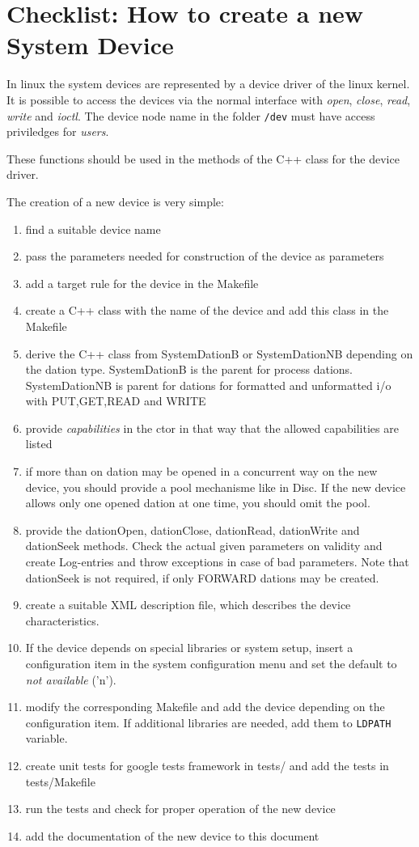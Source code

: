 \section{Checklist: How to create a new System Device}
In linux the system devices are represented by a device driver of
the linux kernel.
It is possible to access the devices via the normal interface
with {\em open}, {\em close}, {\em read}, {\em write} and {\em ioctl}.
The device node name in the folder \verb|/dev| must have access
priviledges for {\em users}.

These functions should be used in the methods of the C++ class 
for the device driver.


The creation of a new device is very simple:
\begin{enumerate}
\item find a suitable device name
\item pass the parameters needed for construction of the device as
      parameters
\item add a target rule for the device in the Makefile
\item create a C++ class with the name of the device and add this class
      in the Makefile
\item derive the C++ class from SystemDationB or SystemDationNB depending
      on the dation type. SystemDationB is the parent for process dations.
      SystemDationNB is parent for dations for formatted and unformatted
      i/o with PUT,GET,READ and WRITE
\item provide {\em capabilities} in the ctor in that way that the allowed
      capabilities are listed
\item if more than on dation may be opened in a concurrent way on the new
      device, you should provide a pool mechanisme like in Disc.
      If the new device allows only one opened dation at one time, you 
      should omit the pool.
\item provide the dationOpen, dationClose, dationRead, dationWrite 
      and dationSeek methods. Check the actual given parameters on
      validity and create Log-entries and throw exceptions in case
      of bad parameters.
      Note that dationSeek is not required, if only FORWARD dations
      may be created.
\item create a suitable XML description file, which describes the
      device characteristics.
\item If the device depends on special libraries or 
      system setup, insert a configuration item  
      in the system configuration menu
      and set the default to {\em not available} ('n').
\item modify the corresponding Makefile and add the device depending on
      the configuration item. If additional libraries are needed,
      add them to \texttt{LDPATH} variable. 
\item create unit tests for google tests framework in tests/ and add the
      tests in tests/Makefile
\item run the tests and check for proper operation of the new device
\item add the documentation of the new device to this document
\end{enumerate}

